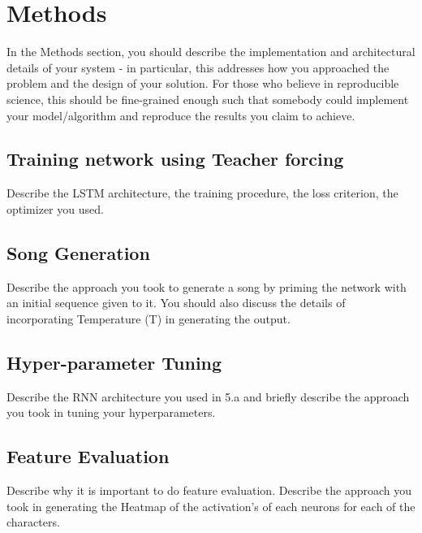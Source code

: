 \section*{Methods}
In the Methods section, you should describe the implementation and architectural details of your system - in particular, this addresses how you approached the problem and the design of your solution. For those who believe in reproducible science, this should be fine-grained enough such that somebody could implement your model/algorithm and reproduce the results you claim to achieve.
\subsection*{Training network using Teacher forcing}
Describe the LSTM architecture, the training procedure, the loss criterion, the optimizer you used.
\subsection*{Song Generation}
Describe the approach you took to generate a song by priming the network with an initial sequence given to it. You should also discuss the details of incorporating Temperature (T) in generating the output.
\subsection*{Hyper-parameter Tuning}
Describe the RNN architecture you used in 5.a and briefly describe the approach you took in tuning your hyperparameters.
\subsection*{Feature Evaluation}
Describe why it is important to do feature evaluation. Describe the approach you took in generating the Heatmap of the activation’s of each neurons for each of the characters.

